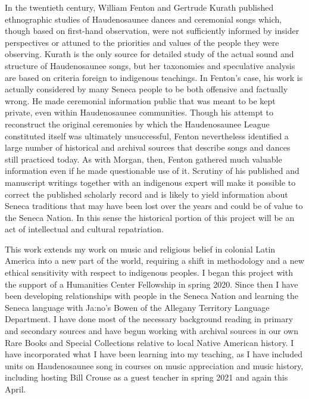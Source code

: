 \documentclass[12pt]{article}
\begin{document}
In the twentieth century, William Fenton and Gertrude Kurath published
ethnographic studies of Haudenosaunee dances and ceremonial songs which,
though based on first-hand observation, were not sufficiently informed by
insider perspectives or attuned to the priorities and values of the people
they were observing.%
\Autocites{Fenton:GreatLaw}{Kurath:IroquoisMusic}
Kurath is the only source for detailed study of the actual sound and structure
of Haudenosaunee songs, but her taxonomies and speculative analysis are based
on criteria foreign to indigenous teachings.
In Fenton's case, his work is actually considered by many Seneca people to be
both offensive and factually wrong.
He made ceremonial information public that was meant to be kept private, even
within Haudenosaunee communities.
Though his attempt to reconstruct the original ceremonies by which the
Haudenosaunee League constituted itself was ultimately unsuccessful, Fenton
nevertheless identified a large number of historical and archival sources that
describe songs and dances still practiced today.
As with Morgan, then, Fenton gathered much valuable information even if he
made questionable use of it.
Scrutiny of his published and manuscript writings together with an indigenous
expert will make it possible to correct the published scholarly record and is
likely to yield information about Seneca traditions that may have been lost
over the years and could be of value to the Seneca Nation.
In this sense the historical portion of this project will be an act of
intellectual and cultural repatriation.

This work extends my work on music and religious belief in colonial Latin
America into a new part of the world, requiring a shift in methodology and a
new ethical sensitivity with respect to indigenous peoples.%
\Autocites{Cashner:HearingFaith}{Cashner:Cards}{Cashner:ImitatingAfricans}
I began this project with the support of a Humanities Center Fellowship in
spring 2020. 
Since then I have been developing relationships with people in the Seneca
Nation and learning the Seneca language with Ja:no's Bowen of the Allegany
Territory Language Department.
I have done most of the necessary background reading in primary and secondary
sources and have begun working with archival sources in our own Rare Books and
Special Collections relative to local Native American history.
I have incorporated what I have been learning into my teaching, as I have
included units on Haudenosaunee song in courses on music appreciation and
music history, including hosting Bill Crouse as a guest teacher in spring 2021
and again this April.
\end{document}
